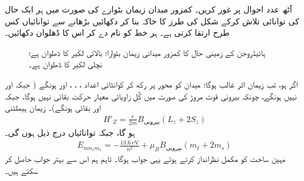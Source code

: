  
 
آٹھ عدد  احوال  پر غور کریں۔ کمزور میدان زیمان بٹوارے کی صورت میں ہر ایک حال کی توانائی تلاش کرکے شکل  کی طرز کا خاکہ بنا کر دکھائیں  بڑھانے سے توانائیاں کس طرح ارتقا کرتی ہے۔ ہر خط کو نام دے کر اس کا ڈھلوان دکھائیں۔
\begin{figure}
\centering
{}
\caption
{ہائیڈروجن کے زمینی حال کا کمزور میدانی زیمان بٹوارا؛ بالائی لکیر  کا ڈھلوان  ہے؛ نچلی لکیر  کا ڈھلوان  ہے۔}
\label{شکل_غیر_تابع_اضطراب_زیمان_بٹوارا_کمزور_میدان}
\end{figure}




اگر  ہو، تب زیمان اثر غالب ہوگا؛  میدان  کو  محور پر رکھ کر  کوانٹائی اعداد ، ، ، اور  ہونگے ( جبکہ  اور  نہیں ہونگے، چونکہ بیرونی قوت مروڑ کی صورت میں کُل زاویائی معیار حرکت بقائی نہیں ہوگا، جبکہ  اور  بقائی ہونگے)۔ زیمان ہیملٹنی 
\begin{align*}
H'_Z = \frac{e}{2m} B_{\text{بیرونی}} (L_z + 2S_z)
\end{align*}
ہو گا، جبکہ  توانائیاں درج ذیل ہوں گی۔ 
\begin{align}\label{مساوات_غیر_مضطرب_طاقتور_زیمان_حصہ}
E_{nm_{\ell}m_s} = - \frac{\SI{13.6}{\electronvolt}}{n^2} + \mu_B B_{\text{بیرونی}} (m_{\ell} + 2m_s)
\end{align}
مہین ساخت کو مکمل نظرانداز کرتے ہوئے یہی جواب ہوگا۔ تاہم ہم اس سے بہتر جواب حاصل کر سکتے ہیں۔

